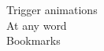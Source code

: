\documentclass[preview]{standalone}
\begin{document}
Trigger animations\\At any word\\Bookmarks\\
\end{document}
